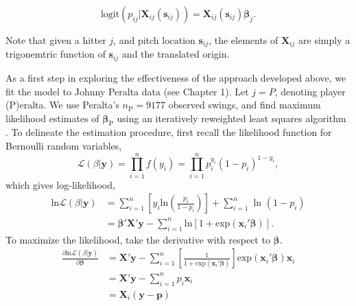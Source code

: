 \begin{equation}
\text{logit}(p_{ij}|\pmb{X}_{ij}(\pmb{s}_{ij})) = \pmb{X}_{ij}(\pmb{s}_{ij}) \pmb{\beta}_{j}.
\end{equation}


Note that given a hitter $j$, and pitch location $\pmb{s}_{ij}$, the elements of $\pmb{X}_{ij}$ are simply a trigonemtric function of $\pmb{s}_{ij}$ and the translated origin.

As a first step in exploring the effectiveness of the approach developed above, we fit the model to Johnny Peralta data (see Chapter 1). Let $j = P$, denoting player (P)eralta. We use Peralta's $n_{\text{P}} = 9177$ observed swings, and find maximum likelihood estimates of $\pmb{\beta}_{\text{P}}$ using an iteratively reweighted least squares algorithm \citep{Myers2012}. To delineate the estimation procedure, first recall the likelihood function for Bernoulli random variables,
\begin{equation}
\mathcal{L}(\beta|\pmb{y}) = \prod_{i=1}^{n} f(y_{i}) =  \prod_{i=1}^{n} p_{i}^{y_{i}}(1-p_{i})^{1-y_{i}},
\end{equation}
which gives log-likelihood, 
\begin{align}
\text{ln} \mathcal{L}(\beta|\pmb{y}) &= \sum_{i=1}^{n} \left[ y_{i} \text{ln}\left(\frac{p_{i}}{1-p_{i}}\right) \right] + \sum_{i=1}^{n} \text{ ln }(1-p_{i}) \\
&= \pmb{\beta}'\pmb{X}'\pmb{y} - \sum_{i=1}^{n} \text{ln}[1 + \text{exp}(\pmb{x}_{i}'\pmb{\beta})].
\end{align}
To maximize the likelihood, take the derivative with respect to $\pmb{\beta}$.
\begin{align}
\frac{\partial \text{ln} \mathcal{L}(\beta|\pmb{y})}{\partial \pmb{\beta}} &= \pmb{X}'\pmb{y} - \sum_{i=1}^{n}  \left[ \frac{1}{1 + \text{exp}(\pmb{x}_{i}'\pmb{\beta})} \right] \text{exp}  (\pmb{x}_{i}' \pmb{\beta}) \pmb{x}_{i} \\
&= \pmb{X}'\pmb{y} - \sum_{i=1}^{n} p_{i} \pmb{x}_{i} \\
&= \pmb{X}_{i}(\pmb{y} - \pmb{p})
\end{align}






